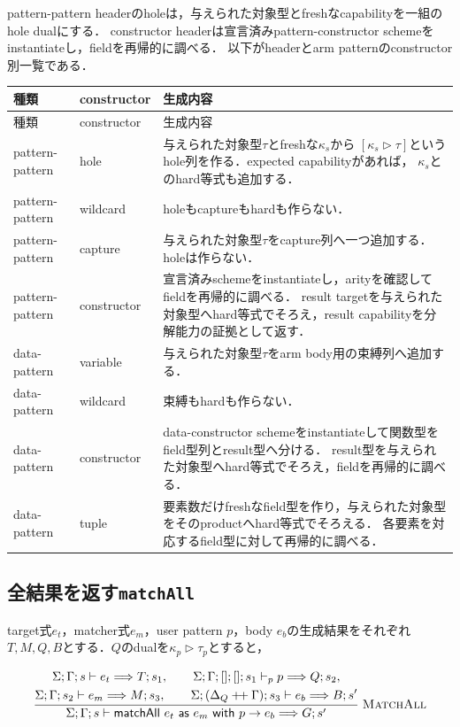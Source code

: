 \documentclass[11pt,a4paper,oneside]{ltjsbook}
\newcommand{\code}[1]{\texttt{#1}}
\begin{document}
pattern-pattern headerのholeは，与えられた対象型とfreshなcapabilityを一組のhole dualにする．
constructor headerは宣言済みpattern-constructor schemeをinstantiateし，fieldを再帰的に調べる．
以下がheaderとarm patternのconstructor別一覧である．

\begin{longtable}{p{30mm}p{45mm}p{63mm}}
\toprule
種類 & constructor & 生成内容 \\
\midrule
\endfirsthead
\toprule
種類 & constructor & 生成内容 \\
\midrule
\endhead
pattern-pattern & hole & 与えられた対象型$\tau$とfreshな$\kappa_s$から
$[\kappa_s\triangleright\tau]$というhole列を作る．expected capabilityがあれば，
$\kappa_s$とのhard等式も追加する．\\
pattern-pattern & wildcard & holeもcaptureもhardも作らない．\\
pattern-pattern & capture & 与えられた対象型$\tau$をcapture列へ一つ追加する．holeは作らない．\\
pattern-pattern & constructor & 宣言済みschemeをinstantiateし，arityを確認してfieldを再帰的に調べる．
result targetを与えられた対象型へhard等式でそろえ，result capabilityを分解能力の証拠として返す．\\
data-pattern & variable & 与えられた対象型$\tau$をarm body用の束縛列へ追加する．\\
data-pattern & wildcard & 束縛もhardも作らない．\\
data-pattern & constructor & data-constructor schemeをinstantiateして関数型をfield型列とresult型へ分ける．
result型を与えられた対象型へhard等式でそろえ，fieldを再帰的に調べる．\\
data-pattern & tuple & 要素数だけfreshなfield型を作り，与えられた対象型をそのproductへhard等式でそろえる．
各要素を対応するfield型に対して再帰的に調べる．\\
\bottomrule
\end{longtable}

\subsection{全結果を返す\code{matchAll}}

target式$e_t$，matcher式$e_m$，user pattern $p$，body $e_b$の生成結果をそれぞれ
$T,M,Q,B$とする．$Q$のdualを$\kappa_p\triangleright\tau_p$とすると，

\[
\frac{
  \begin{gathered}
  \Sigma;\Gamma;s\vdash e_t\Longrightarrow T;s_1,\qquad
  \Sigma;\Gamma;[];[];s_1\vdash_p p\Longrightarrow Q;s_2,\\
  \Sigma;\Gamma;s_2\vdash e_m\Longrightarrow M;s_3,\qquad
  \Sigma;(\Delta_Q\mathbin{+\!+}\Gamma);s_3\vdash e_b\Longrightarrow B;s'
  \end{gathered}
}{
  \Sigma;\Gamma;s\vdash
  \mathsf{matchAll}\ e_t\ \mathsf{as}\ e_m\ \mathsf{with}\ p\to e_b
  \Longrightarrow G;s'
}\;\textsc{MatchAll}
\]
\end{document}

